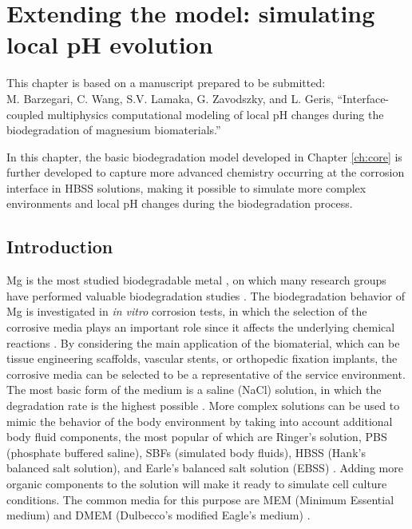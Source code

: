 \chapter{Extending the model: simulating local pH evolution}\label{ch:kinetics}


\begin{tcolorbox}
This chapter is based on a manuscript prepared to be submitted:\\
M. Barzegari, C. Wang, S.V. Lamaka, G. Zavodszky, and L. Geris, ``Interface-coupled multiphysics computational modeling of local pH changes during the biodegradation of magnesium biomaterials.''
\end{tcolorbox}

In this chapter, the basic biodegradation model developed in Chapter \ref{ch:core} is further developed to capture more advanced chemistry occurring at the corrosion interface in HBSS solutions, making it possible to simulate more complex environments and local pH changes during the biodegradation process.

\section{Introduction}

Mg is the most studied biodegradable metal \cite{Liu2019,Zheng2014,Chen2014,Zhang2013}, on which many research groups have performed valuable biodegradation studies \cite{Esmaily2017,Li2016,Atrens2020,Kirkland2012}. The biodegradation behavior of Mg is investigated in \textit{in vitro} corrosion tests, in which the selection of the corrosive media plays an important role since it affects the underlying chemical reactions \cite{Mei2020}. By considering the main application of the biomaterial, which can be tissue engineering scaffolds, vascular stents, or orthopedic fixation implants, the corrosive media can be selected to be a representative of the service environment. The most basic form of the medium is a saline (NaCl) solution, in which the degradation rate is the highest possible \cite{Mei2020}. More complex solutions can be used to mimic the behavior of the body environment by taking into account additional body fluid components, the most popular of which are Ringer's solution, {PBS} (phosphate buffered saline), {SBF}s (simulated body fluids), {HBSS} (Hank's balanced salt solution), and Earle's balanced salt solution ({EBSS}) \cite{Mei2020}. Adding more organic components to the solution will make it ready to simulate cell culture conditions. The common media for this purpose are {MEM} (Minimum Essential medium) and {DMEM} (Dulbecco's modified Eagle's medium) \cite{Mei2020}.

